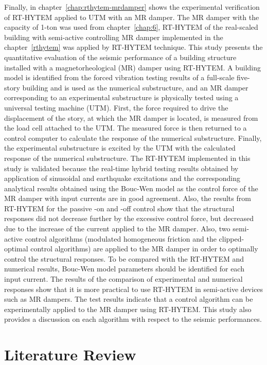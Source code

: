 Finally, in chapter~\ref{chap:rthytem-mrdamper} shows the experimental verification of RT-HYTEM applied to UTM with an MR damper. The MR damper with the capacity of 1-ton was used from chapter~\ref{chap:6}, RT-HYTEM of the real-scaled building with semi-active controlling MR damper implemented in the chapter~\ref{rthytem} was applied by RT-HYTEM technique. This study presents the quantitative evaluation of the seismic performance of a building structure installed with a magnetorheological (MR) damper using RT-HYTEM. A building model is identified from the forced vibration testing results of a full-scale five-story building and is used as the numerical substructure, and an MR damper corresponding to an experimental substructure is physically tested using a universal testing machine (UTM). First, the force required to drive the displacement of the story, at which the MR damper is located, is measured from the load cell attached to the UTM. The measured force is then returned to a control computer to calculate the response of the numerical substructure. Finally, the experimental substructure is excited by the UTM with the calculated response of the numerical substructure. The RT-HYTEM implemented in this study is validated because the real-time hybrid testing results obtained by application of sinusoidal and earthquake excitations and the corresponding analytical results obtained using the Bouc-Wen model as the control force of the MR damper with input currents are in good agreement. Also, the results from RT-HYTEM for the passive -on and -off control show that the structural responses did not decrease further by the excessive control force, but decreased due to the increase of the current applied to the MR damper. Also, two semi-active control algorithms (modulated homogeneous friction and the clipped-optimal control algorithms) are applied to the MR damper in order to optimally control the structural responses. To be compared with the RT-HYTEM and numerical results, Bouc-Wen model parameters should be identified for each input current. The results of the comparison of experimental and numerical responses show that it is more practical to use RT-HYTEM in semi-active devices such as MR dampers. The test results indicate that a control algorithm can be experimentally applied to the MR damper using RT-HYTEM. This study also provides a discussion on each algorithm with respect to the seismic performances.


\section{Literature Review}
